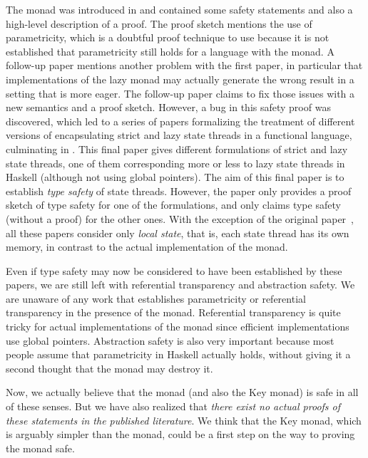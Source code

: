 \documentclass{sigplanconf}
\begin{document}
The \st{} monad was introduced in \cite{stmonad} and contained some safety statements and also a high-level description of a proof. The proof sketch mentions the use of parametricity, which is a doubtful proof technique to use because it is not established that parametricity still holds for a language with the \st{} monad. A follow-up paper \cite{LaunchburySabry} mentions another problem with the first paper, in particular that implementations of the lazy \st{} monad may actually generate the wrong result in a setting that is more eager. The follow-up paper claims to fix those issues with a new semantics and a proof sketch. However, a bug in this safety proof was discovered, which led to a series of papers \cite{LaunchburySabry,AriolaSabry} formalizing the treatment of different versions of encapsulating strict and lazy state threads in a functional language, culminating in \cite{MoggiSabry}. This final paper gives different formulations of strict and lazy state threads, one of them corresponding more or less to lazy state threads in Haskell (although not using global pointers). The aim of this final paper is to establish {\em type safety} of state threads. However, the paper only provides a proof sketch of type safety for one of the formulations, and only claims type safety (without a proof) for the other ones. With the exception of the original paper~\cite{stmonad}, all these papers consider only \emph{local state}, that is, each state thread has its own memory, in contrast to the actual implementation of the \st{} monad.

Even if type safety may now be considered to have been established by these papers, we are still left with referential transparency and abstraction safety. We are unaware of any work that establishes parametricity or referential transparency in the presence of the \st{} monad. Referential transparency is quite tricky for actual implementations of the \st{} monad since efficient implementations use global pointers. Abstraction safety is also very important because most people assume that parametricity in Haskell actually holds, without giving it a second thought that the \st{} monad may destroy it. 

Now, we actually believe that the \st{} monad (and also the Key monad) is safe in all of these senses. But we have also realized that {\em there exist no actual proofs of these statements in the published literature}. We think that the Key monad, which is arguably simpler than the \st{} monad, could be a first step on the way to proving the \st{} monad safe.
\end{document}
